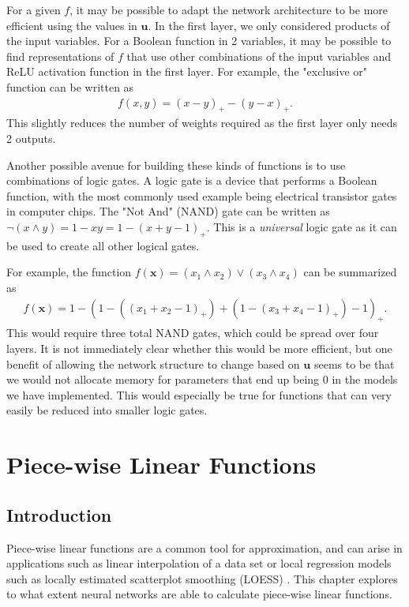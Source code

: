 \documentclass{somasmsc}
\begin{document}
For a given $f$, it may be possible to adapt the network architecture to be more efficient using the values in $\pmb{u}$. In the first layer, we only considered products of the input variables. For a Boolean function in 2 variables, it may be possible to find representations of $f$ that use other combinations of the input variables and ReLU activation function in the first layer. For example, the "exclusive or" function can be written as
\begin{align*}
f(x, y) = \left(x - y\right)_+ - \left(y - x\right)_+.
\end{align*}
This slightly reduces the number of weights required as the first layer only needs 2 outputs.

Another possible avenue for building these kinds of functions is to use combinations of logic gates. A logic gate is a device that performs a Boolean function, with the most commonly used example being electrical transistor gates in computer chips. The "Not And" (NAND) gate can be written as $\lnot\left(x \land y\right) = 1 - xy = 1 - \left(x + y - 1\right)_+$. This is a \textit{universal} logic gate as it can be used to create all other logical gates.

For example, the function $f(\pmb{x}) = \left(x_1 \land x_2\right) \lor \left(x_3 \land x_4\right)$ can be summarized as
\begin{align*}
f(\pmb{x}) = 1 - \left(1 - \left(\left(x_1 + x_2 - 1\right)_+\right) + \left(1 - \left(x_3 + x_4 - 1\right)_+\right) - 1\right)_+.
\end{align*}
This would require three total NAND gates, which could be spread over four layers. It is not immediately clear whether this would be more efficient, but one benefit of allowing the network structure to change based on $\pmb{u}$ seems to be that we would not allocate memory for parameters that end up being 0 in the models we have implemented. This would especially be true for functions that can very easily be reduced into smaller logic gates.


\chapter{Piece-wise Linear Functions}

\section{Introduction}

Piece-wise linear functions are a common tool for approximation, and can arise in applications such as linear interpolation of a data set or local regression models such as locally estimated scatterplot smoothing (LOESS) \citep{cleveland1979robust}. This chapter explores to what extent neural networks are able to calculate piece-wise linear functions.
\end{document}
